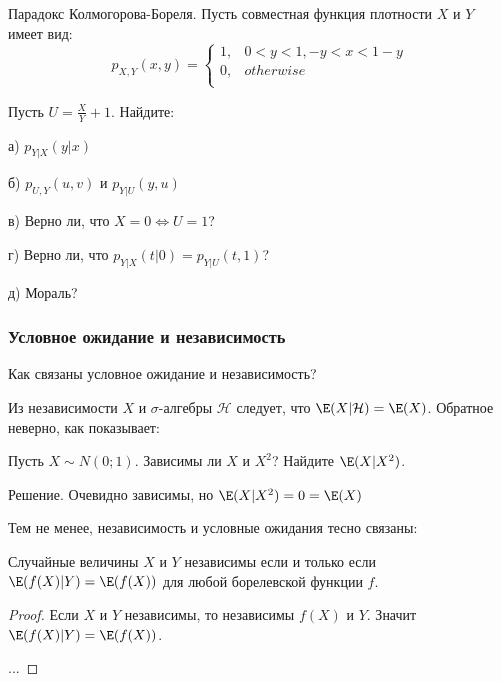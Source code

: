 {\begin{myex} Парадокс Колмогорова-Бореля.
Пусть совместная функция плотности $X$ и $Y$ имеет вид: 
\begin{equation}
p_{X,Y}(x,y)=\left\{
\begin{array}{ll}
  1, & 0<y<1, -y<x<1-y \\
  0, & otherwise \\
\end{array}
\right.
\end{equation}

Пусть $U=\frac{X}{Y}+1$. Найдите: 

а) $p_{Y|X}(y|x)$ 

б) $p_{U,Y}(u,v)$ и $p_{Y|U}(y,u)$ 

в) Верно ли, что $X=0 \Leftrightarrow U=1$? 

г) Верно ли, что $p_{Y|X}(t|0)=p_{Y|U}(t,1)$? 

д) Мораль? 

\end{myex}







\subsubsection*{Условное ожидание и независимость}

Как связаны условное ожидание и независимость? 

Из независимости $ X $ и $ \sigma $-алгебры $ \mathcal{H} $ следует, что $ \E(X|\mathcal{H})=\E(X)$. Обратное неверно, как показывает:
\begin{myex}
Пусть $ X\sim N(0;1) $. Зависимы ли $ X $ и $ X^{2} $? Найдите $ \E(X|X^{2}) $. 

Решение. Очевидно зависимы, но $ \E(X|X^{2})=0=\E(X) $
\end{myex}

Тем не менее, независимость и условные ожидания тесно связаны:
\begin{myth}
Случайные величины $ X $ и $ Y $ независимы если и только если $ \E(f(X)|Y)=\E(f(X))$ для любой борелевской функции $f$.
\end{myth}
\begin{proof}
Если $ X $ и $Y  $ независимы, то независимы $f(X)  $ и $ Y $. Значит $ \E(f(X)|Y)=\E(f(X))$.

...

\end{proof}

}
